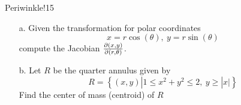 \documentclass[titlepage]{article}
\begin{document}
\fancyhf{}
\cfoot{\thepage}

\begin{cproblem}{1}{Periwinkle!15}
\phantom{-} \\
\vspace{-.5cm}
\begin{itemize}
\item[a.] Given the transformation for polar coordinates 
$$x = r\cos\left(\theta\right), \ y = r\sin\left(\theta\right) $$
compute the Jacobian $\frac{\partial (x,y)}{\partial (r,\theta)}$.
\item[b.] Let $R$ be the quarter annulus given by
$$R = \left\{(x,y)| 1\leq x^2 + y^2 \leq 2, \ y \geq |x|\right\}$$
Find the center of mass (centroid) of $R$
\end{itemize}
\end{cproblem}
\end{document}
